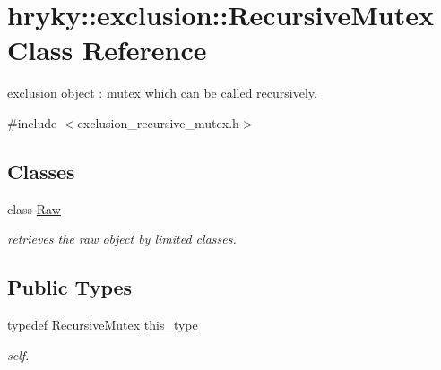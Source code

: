 \hypertarget{classhryky_1_1exclusion_1_1_recursive_mutex}{\section{hryky\-:\-:exclusion\-:\-:Recursive\-Mutex Class Reference}
\label{classhryky_1_1exclusion_1_1_recursive_mutex}
}


exclusion object \-: mutex which can be called recursively.  




{\ttfamily \#include $<$exclusion\-\_\-recursive\-\_\-mutex.\-h$>$}

\subsection*{Classes}
\begin{DoxyCompactItemize}
\item 
class \hyperlink{classhryky_1_1exclusion_1_1_recursive_mutex_1_1_raw}{Raw}
\begin{DoxyCompactList}\small\item\em retrieves the raw object by limited classes. \end{DoxyCompactList}\end{DoxyCompactItemize}
\subsection*{Public Types}
\begin{DoxyCompactItemize}
\item 
\hypertarget{classhryky_1_1exclusion_1_1_recursive_mutex_afc05f6bc3336fc6a5830bd3a7cc9b397}{typedef \hyperlink{classhryky_1_1exclusion_1_1_recursive_mutex}{Recursive\-Mutex} \hyperlink{classhryky_1_1exclusion_1_1_recursive_mutex_afc05f6bc3336fc6a5830bd3a7cc9b397}{this\-\_\-type}}\label{classhryky_1_1exclusion_1_1_recursive_mutex_afc05f6bc3336fc6a5830bd3a7cc9b397}

\begin{DoxyCompactList}\small\item\em self. \end{DoxyCompactList}\end{DoxyCompactItemize}
